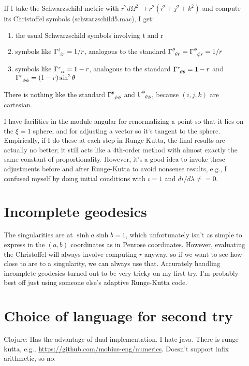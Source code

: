 \documentclass{article}
\begin{document}
If I take the Schwarzschild metric with $r^2 d\Omega^2\rightarrow r^2(i^2+j^2+k^2)$ and
compute its Christoffel symbols (schwarzschild5.mac), I get:
\begin{enumerate}
\item the usual Schwarzschild symbols involving t and r
\item symbols like $\Gamma\indices{^i_i_r} = 1/r$, analogous to the standard
                          $\Gamma\indices{^\theta_\theta_r} = \Gamma\indices{^\phi_\phi_r} = 1/r$
\item symbols like $\Gamma\indices{^r_i_i} = 1-r$, analogous to the standard
                         $\Gamma\indices{^r_\theta_\theta}=1-r$ and
                         $\Gamma\indices{^r_\phi_\phi}=(1-r)\sin^2\theta$
\end{enumerate}
There is nothing like the standard $\Gamma\indices{^\theta_\phi_\phi}$ and
$\Gamma\indices{^\phi_\theta_\phi}$, because $(i,j,k)$ are cartesian.

I have facilities in the module angular for renormalizing a point so that it lies on the
$\xi=1$ sphere, and for adjusting a vector so it's tangent to the sphere. Empirically,
if I do these at each step in Runge-Kutta, the final results are actually no better; it
still acts like a 4th-order method with almost exactly the same constant of proportionality.
However, it's a good idea to invoke these adjustments before and after Runge-Kutta to avoid
nonsense results, e.g., I confused myself by doing initial conditions with $i=1$ and
$di/d\lambda\ne=0$.

\section{Incomplete geodesics}
The singularities are at $\sinh a\sinh b=1$, which unfortunately isn't as simple to express in the
$(a,b)$ coordinates as in Penrose coordinates. However, evaluating the Christoffel will always
involve computing $r$ anyway, so if we want to see how close to are to a singularity, we can always
use that. Accurately handling incomplete geodesics turned out to be very tricky on my first try.
I'm probably best off just using someone else's adaptive Runge-Kutta code.

\section{Choice of language for second try}
Clojure: Has the advantage of dual implementation. I hate java. There is runge-kutta, e.g.,
\url{https://github.com/mobius-eng/numerics}. Doesn't support infix arithmetic, so no.
\end{document}
